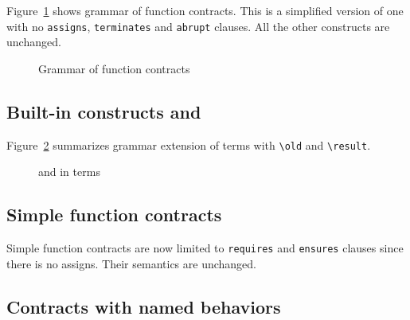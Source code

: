 
Figure~\ref{fig:gram:contracts} shows grammar of function
contracts. This is a simplified version of \acsl one with no
\lstinline|assigns|, \lstinline|terminates| and \lstinline|abrupt|
clauses. All the other constructs are unchanged.
\begin{figure}[htbp]
  \begin{cadre}
      
   \end{cadre}
    \caption{Grammar of function contracts}
  \label{fig:gram:contracts}
\end{figure}


\subsection{Built-in constructs %
  \texorpdfstring{\old}{\textbackslash{}old} %
 and \texorpdfstring{\result}{\textbackslash{}result}}

\nodiff

Figure~\ref{fig:gram:oldandresult} summarizes grammar extension of terms with
\lstinline|\old| and \lstinline|\result|.
\begin{figure}[htbp]
  \begin{cadre}
      
    \end{cadre}
    \caption{\protect\old and \protect\result in terms}
  \label{fig:gram:oldandresult}
\end{figure}



\subsection{Simple function contracts}
\label{sec:simplecontracts}


Simple function contracts are now limited to \lstinline|requires| and
\lstinline|ensures| clauses since there is no assigns. Their semantics are
unchanged.


\subsection{Contracts with named behaviors}
\label{subsec:behaviors}

